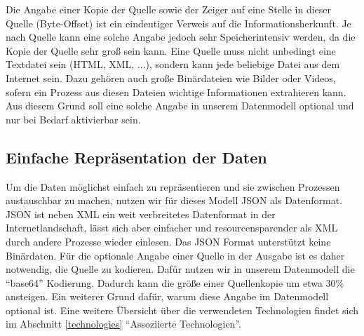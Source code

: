 Die Angabe einer Kopie der Quelle sowie der Zeiger auf eine Stelle in dieser Quelle (Byte-Offset) ist ein eindeutiger Verweis auf die Informationsherkunft. Je nach Quelle kann eine solche Angabe jedoch sehr Speicherintensiv werden, da die Kopie der Quelle sehr groß sein kann. Eine Quelle muss nicht unbedingt eine Textdatei sein (HTML, XML, ...), sondern kann jede beliebige Datei aus dem Internet sein. Dazu gehören auch große Binärdateien wie Bilder oder Videos, sofern ein Prozess aus diesen Dateien wichtige Informationen extrahieren kann. Aus diesem Grund soll eine solche Angabe in unserem Datenmodell optional und nur bei Bedarf aktivierbar sein.

\subsection{Einfache Repräsentation der Daten}
Um die Daten möglichst einfach zu repräsentieren und sie zwischen Prozessen austauschbar zu machen, nutzen wir für dieses Modell JSON als Datenformat. JSON ist neben XML ein weit verbreitetes Datenformat in der Internetlandschaft, lässt sich aber einfacher und resourcensparender als XML durch andere Prozesse wieder einlesen. Das JSON Format unterstützt keine Binärdaten. Für die optionale Angabe einer Quelle in der Ausgabe ist es daher notwendig, die Quelle zu kodieren. Dafür nutzen wir in unserem Datenmodell die ``base64'' Kodierung. Dadurch kann die größe einer Quellenkopie um etwa $30\%$ ansteigen. Ein weiterer Grund dafür, warum diese Angabe im Datenmodell optional ist. Eine weitere Übersicht über die verwendeten Technologien findet sich im Abschnitt \ref{technologies} ``Assoziierte Technologien''.
